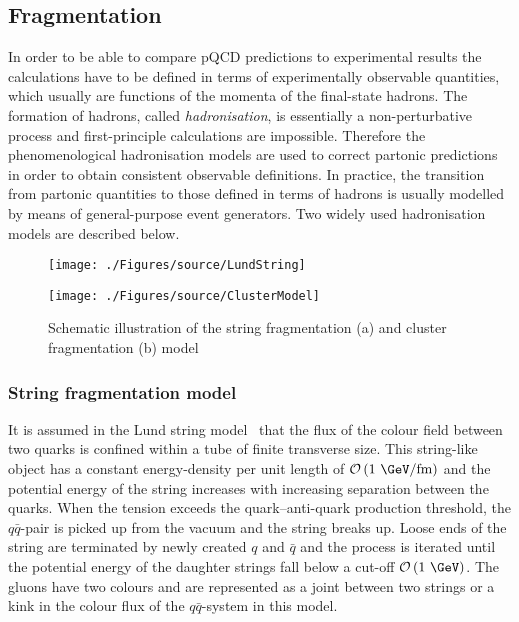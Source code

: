 \subsection{Fragmentation}
\label{subsec:fragmentation}
In order to be able to compare pQCD predictions to experimental results the calculations have to be defined in terms of experimentally observable quantities, which usually are functions of the momenta of the final-state hadrons. The formation of hadrons, called \emph{hadronisation}, is essentially a non-perturbative process and first-principle calculations are impossible. Therefore the phenomenological hadronisation models are used to correct partonic predictions in order to obtain consistent observable definitions. In practice, the transition from partonic quantities to those defined in terms of hadrons is usually modelled by means of general-purpose event generators. Two widely used hadronisation models are described below.
\begin{figure}[t]
	\centering
	\begin{subfloat}[]{
		\texttt{[image: ./Figures/source/LundString]}
		\label{fig:lund}
	 }%
	\end{subfloat}
	\begin{subfloat}[]{
		\texttt{[image: ./Figures/source/ClusterModel]}
		\label{fig:cluster}
	}%
	\end{subfloat}
	\caption{Schematic illustration of the string fragmentation (a) and cluster fragmentation (b) model}
\label{fig:fragmentationmodels}
\end{figure}
\subsubsection{String fragmentation model}
It is assumed in the Lund string model~\cite{Andersson:1983ia} that the flux of the colour field between two quarks is confined within a tube of finite transverse size. This string-like object has a constant energy-density per unit length of $\mathcal{O}\left( \text{1 \GeV/fm}\right)$ and the potential energy of the string increases with increasing separation between the quarks. When the tension exceeds the quark--anti-quark production threshold, the $q\bar{q}$-pair is picked up from the vacuum and the string breaks up. Loose ends of the string are terminated by newly created $q$ and $\bar{q}$ and the process is iterated until the potential energy of the daughter strings fall below a cut-off $\mathcal{O}\left( \text{1 \GeV}\right)$. The gluons have two colours and are represented as a joint between two strings or a kink in the colour flux of the $q\bar{q}$-system in this model. 

